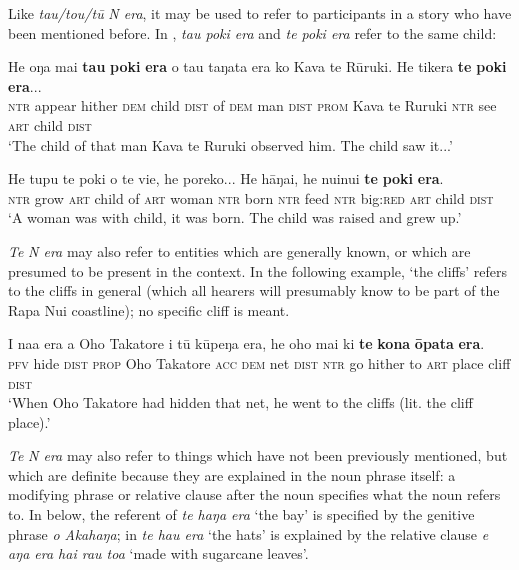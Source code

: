 Like \textit{tau/tou/tū} \textit{N era}, it may be used to refer to participants in a story who have been mentioned before. In , \textit{tau poki era} and \textit{te poki era} refer to the same child:

\ea\label{ex:4.201}
\gll He oŋa mai \textbf{tau} \textbf{poki} \textbf{era} o tau taŋata era ko Kava te Rūruki. He tikera \textbf{te} \textbf{poki} \textbf{era}...\\
\textsc{ntr} appear hither \textsc{dem} child \textsc{dist} of \textsc{dem} man \textsc{dist} \textsc{prom} Kava te Ruruki \textsc{ntr} see \textsc{art} child \textsc{dist}\\

\glt 
‘The child of that man Kava te Ruruki observed him. The child saw it...’ \textstyleExampleref{[Ley-9-57.035]}
\z

\ea\label{ex:4.202}
\gll He tupu te poki o te vi{\ꞌ}e, he poreko... He hāŋai, he nuinui  \textbf{te} \textbf{poki} \textbf{era}.\\
\textsc{ntr} grow \textsc{art} child of \textsc{art} woman \textsc{ntr} born \textsc{ntr} feed \textsc{ntr} big:\textsc{red}  \textsc{art} child \textsc{dist}\\

\glt
‘A woman was with child, it was born. The child was raised and grew up.’ \textstyleExampleref{[Mtx-7-21.004–005]}
\z

\textit{Te} \textit{N era} may also refer to entities which are generally known, or which are presumed to be present in the context. In the following example, ‘the cliffs’ refers to the cliffs in general (which all hearers will presumably know to be part of the Rapa Nui coastline); no specific cliff is meant.

\ea\label{ex:4.203}
\gll I na{\ꞌ}a era a {\ꞌ}Oho Takatore i tū kūpeŋa era, he oho mai  ki \textbf{te} \textbf{kona} \textbf{{\ꞌ}ōpata} \textbf{era}.\\
\textsc{pfv} hide \textsc{dist} \textsc{prop} Oho Takatore \textsc{acc} \textsc{dem} net \textsc{dist} \textsc{ntr} go hither  to \textsc{art} place cliff \textsc{dist}\\

\glt
‘When Oho Takatore had hidden that net, he went to the cliffs (lit. the cliff place).’ \textstyleExampleref{[R304.110]} 
\z

\textit{Te} \textit{N era} may also refer to things which have not been previously mentioned, but which are definite because they are explained in the noun phrase itself: a modifying phrase or relative clause after the noun specifies what the noun refers to. In  below, the referent of \textit{te haŋa era} ‘the bay’ is specified by the genitive phrase \textit{o {\ꞌ}Akahaŋa}; in  \textit{te ha{\ꞌ}u era} ‘the hats’ is explained by the relative clause \textit{e aŋa era hai rau toa} ‘made with sugarcane leaves’.

